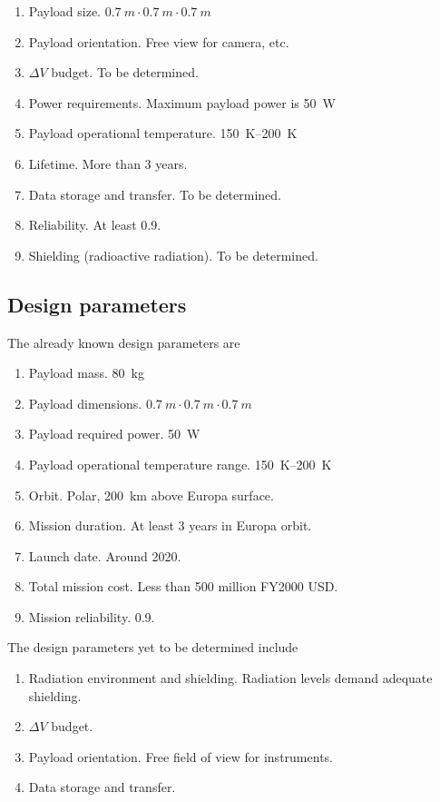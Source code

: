 \begin{enumerate}
\item{Payload size.} $\SI{0.7}{m} \cdot \SI{0.7}{m} \cdot \SI{0.7}{m}$
\item{Payload orientation.} Free view for camera, etc.
\item{$\Delta V$ budget.} To be determined.
\item{Power requirements.} Maximum payload power is \SI{50}{W}
\item{Payload operational temperature.} \SI{150}{K}--\SI{200}{K}
\item{Lifetime.} More than 3 years.
\item{Data storage and transfer.} To be determined.
\item{Reliability.} At least 0.9.
\item{Shielding (radioactive radiation).} To be determined.
\end{enumerate}

\subsection{Design parameters}
The already known design parameters are

\begin{enumerate}
\item{Payload mass.} \SI{80}{kg}
\item{Payload dimensions.} $\SI{0.7}{m} \cdot \SI{0.7}{m} \cdot \SI{0.7}{m}$
\item{Payload required power.} \SI{50}{W}
\item{Payload operational temperature range.} \SI{150}{K}--\SI{200}{K}
\item{Orbit.} Polar, \SI{200}{km} above Europa surface.
\item{Mission duration.} At least 3 years in Europa orbit.
\item{Launch date.} Around 2020.
\item{Total mission cost.} Less than 500 million FY2000 USD.
\item{Mission reliability.} 0.9.
\end{enumerate}
The design parameters yet to be determined include

\begin{enumerate}
\item{Radiation environment and shielding.} Radiation levels demand adequate
  shielding.
\item{$\Delta V$ budget.}
\item{Payload orientation.} Free field of view for instruments.
\item{Data storage and transfer.}
\end{enumerate}
